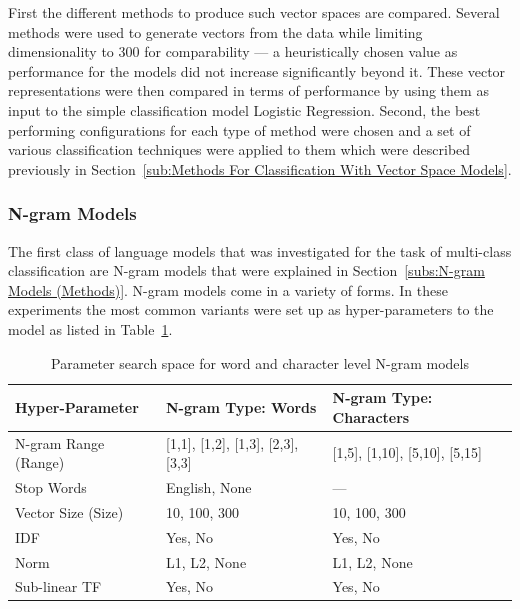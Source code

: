 First the different methods to produce such vector spaces are compared. Several methods were used to generate vectors from the data while limiting dimensionality to 300 for comparability --- a heuristically chosen value as performance for the models did not increase significantly beyond it. These vector representations were then compared in terms of performance by using them as input to the simple classification model Logistic Regression.
Second, the best performing configurations for each type of method were chosen and a set of various classification techniques were applied to them which were described previously in Section~\ref{sub:Methods For Classification With Vector Space Models}.

\subsubsection{N-gram Models}
\label{subs:N-gram Models (Experiments and Results)}

The first class of language models that was investigated for the task of multi-class classification are N-gram models that were explained in Section~\ref{subs:N-gram Models (Methods)}.
N-gram models come in a variety of forms. In these experiments the most common variants were set up as hyper-parameters to the model as  listed in Table~\ref{tab:N-gram Hyper-parameters Space}.

\begin{table}[h]
  \begin{center}
  \begin{tabular}{ l l l}
    \toprule
    Hyper-Parameter & N-gram Type: Words & N-gram Type: Characters \\
    \midrule
    N-gram Range (Range) & [1,1], [1,2], [1,3], [2,3], [3,3] & [1,5], [1,10], [5,10], [5,15] \\
    Stop Words & English, None & --- \\
    Vector Size (Size) & 10, 100, 300 & 10, 100, 300 \\
    IDF & Yes, No & Yes, No \\
    Norm & L1, L2, None & L1, L2, None \\
    Sub-linear TF & Yes, No & Yes, No \\
    \bottomrule
  \end{tabular}
  \caption{Parameter search space for word and character level N-gram models}
\label{tab:N-gram Hyper-parameters Space}
\end{center}
\end{table}


